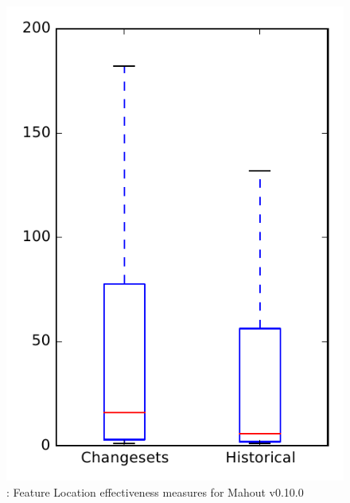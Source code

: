 
\begin{figure}
\centering
\includegraphics[height=0.4\textheight]{figures/flt/rq2_mahout_no_outlier}
\caption{\ftwo: Feature Location effectiveness measures for Mahout v0.10.0}
\label{fig:flt:rq2:mahout}
\end{figure}
